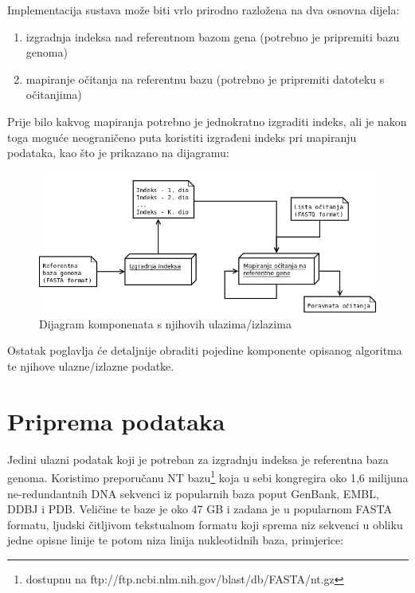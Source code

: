 \documentclass[times, utf8, diplomski]{fer}
\begin{document}
Implementacija sustava može biti vrlo prirodno razložena na dva osnovna dijela:

\begin{enumerate}
\item izgradnja indeksa nad referentnom bazom gena (potrebno je pripremiti bazu genoma)
\item mapiranje očitanja na referentnu bazu (potrebno je pripremiti datoteku s očitanjima)
\end{enumerate}

Prije bilo kakvog mapiranja potrebno je jednokratno izgraditi indeks, ali je nakon toga moguće neograničeno puta koristiti izgrađeni indeks pri mapiranju podataka, kao što je prikazano na dijagramu:

\begin{figure}[!ht]
\begin{center}
	\includegraphics[width=1\textwidth]{../img/Komponente.png}
	\caption{Dijagram komponenata s njihovih ulazima/izlazima}
\end{center}
\end{figure}

Ostatak poglavlja će detaljnije obraditi pojedine komponente opisanog algoritma te njihove ulazne/izlazne podatke.

\section{Priprema podataka}
Jedini ulazni podatak koji je potreban za izgradnju indeksa je referentna baza genoma. Koristimo preporučanu 
NT bazu\footnote{dostupnu na ftp://ftp.ncbi.nlm.nih.gov/blast/db/FASTA/nt.gz} koja u sebi
kongregira oko 1,6 milijuna ne-redundantnih DNA sekvenci iz popularnih baza poput GenBank, EMBL, DDBJ i PDB. Veličine te baze je oko 47 GB i zadana je u popularnom FASTA formatu, ljudski čitljivom tekstualnom formatu koji
sprema niz sekvenci u obliku jedne opisne linije te potom niza linija nukleotidnih baza, primjerice:
\end{document}
